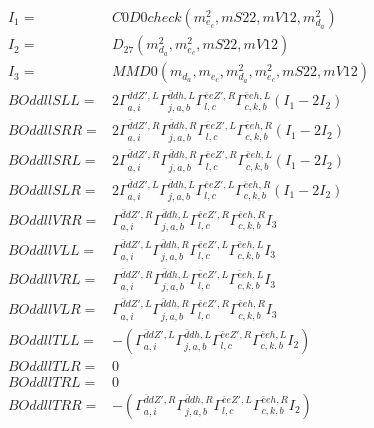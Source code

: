 \documentclass[A4,landscape]{article}
\begin{document}
\begin{align} 
I_1 = & C0D0check(m^2_{e_{{c}}}, mS22, mV12, m^2_{d_{{a}}}) \\ 
I_2 = & D_{27}(m^2_{d_{{a}}}, m^2_{e_{{c}}}, mS22, mV12) \\ 
I_3 = & MMD0(m_{d_{{a}}}, m_{e_{{c}}}, m^2_{d_{{a}}}, m^2_{e_{{c}}}, mS22, mV12) \\ 
  BOddllSLL= & 2  \Gamma^{\bar{d}d {Z'} ,L}_{a, i} \Gamma^{\bar{d}d h ,L}_{j, a, b} \Gamma^{\bar{e}e {Z'} ,R}_{l, c} \Gamma^{\bar{e}e h ,L}_{c, k, b} (I_1 - 2 I_2) \\ 
  BOddllSRR= & 2  \Gamma^{\bar{d}d {Z'} ,R}_{a, i} \Gamma^{\bar{d}d h ,R}_{j, a, b} \Gamma^{\bar{e}e {Z'} ,L}_{l, c} \Gamma^{\bar{e}e h ,R}_{c, k, b} (I_1 - 2 I_2) \\ 
  BOddllSRL= & 2  \Gamma^{\bar{d}d {Z'} ,R}_{a, i} \Gamma^{\bar{d}d h ,R}_{j, a, b} \Gamma^{\bar{e}e {Z'} ,R}_{l, c} \Gamma^{\bar{e}e h ,L}_{c, k, b} (I_1 - 2 I_2) \\ 
  BOddllSLR= & 2  \Gamma^{\bar{d}d {Z'} ,L}_{a, i} \Gamma^{\bar{d}d h ,L}_{j, a, b} \Gamma^{\bar{e}e {Z'} ,L}_{l, c} \Gamma^{\bar{e}e h ,R}_{c, k, b} (I_1 - 2 I_2) \\ 
  BOddllVRR= &  \Gamma^{\bar{d}d {Z'} ,R}_{a, i} \Gamma^{\bar{d}d h ,L}_{j, a, b} \Gamma^{\bar{e}e {Z'} ,R}_{l, c} \Gamma^{\bar{e}e h ,R}_{c, k, b} I_3 \\ 
  BOddllVLL= &  \Gamma^{\bar{d}d {Z'} ,L}_{a, i} \Gamma^{\bar{d}d h ,R}_{j, a, b} \Gamma^{\bar{e}e {Z'} ,L}_{l, c} \Gamma^{\bar{e}e h ,L}_{c, k, b} I_3 \\ 
  BOddllVRL= &  \Gamma^{\bar{d}d {Z'} ,R}_{a, i} \Gamma^{\bar{d}d h ,L}_{j, a, b} \Gamma^{\bar{e}e {Z'} ,L}_{l, c} \Gamma^{\bar{e}e h ,L}_{c, k, b} I_3 \\ 
  BOddllVLR= &  \Gamma^{\bar{d}d {Z'} ,L}_{a, i} \Gamma^{\bar{d}d h ,R}_{j, a, b} \Gamma^{\bar{e}e {Z'} ,R}_{l, c} \Gamma^{\bar{e}e h ,R}_{c, k, b} I_3 \\ 
  BOddllTLL= & -( \Gamma^{\bar{d}d {Z'} ,L}_{a, i} \Gamma^{\bar{d}d h ,L}_{j, a, b} \Gamma^{\bar{e}e {Z'} ,R}_{l, c} \Gamma^{\bar{e}e h ,L}_{c, k, b} I_2) \\ 
  BOddllTLR= & 0 \\ 
  BOddllTRL= & 0 \\ 
  BOddllTRR= & -( \Gamma^{\bar{d}d {Z'} ,R}_{a, i} \Gamma^{\bar{d}d h ,R}_{j, a, b} \Gamma^{\bar{e}e {Z'} ,L}_{l, c} \Gamma^{\bar{e}e h ,R}_{c, k, b} I_2) \\ 
\end{align} 
\end{document}
